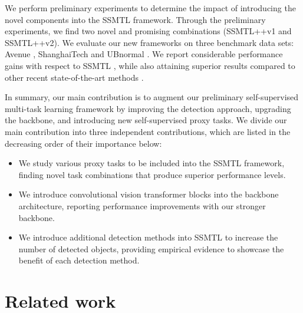 \documentclass[times,twocolumn,final,authoryear]{elsarticle}
\begin{document}
We perform preliminary experiments to determine the impact of introducing the novel components into the SSMTL framework. Through the preliminary experiments, we find two novel and promising combinations (SSMTL++v1 and SSMTL++v2). We evaluate our new frameworks on three benchmark data sets: Avenue \citep{Lu-ICCV-2013}, ShanghaiTech \citep{Luo-ICCV-2017} and UBnormal \citep{Acsintoae-CVPR-2022}. We report considerable performance gains with respect to SSMTL \citep{Georgescu-CVPR-2021}, while also attaining superior results compared to other recent state-of-the-art methods \citep{Astrid-BMVC-2021,Astrid-ICCVW-2021,Bertasius-ICML-2021,Chang-RP-2022,Dong-Access-2020,Doshi-CVPRW-2020a,Doshi-CVPRW-2020b,Georgescu-TPAMI-2021,Gong-ICCV-2019,Ionescu-CVPR-2019,Ionescu-WACV-2019,Ji-IJCNN-2020,Lee-TIP-2019,Li-CVIU-2021,Lin-AAAI-2022,Liu-ICCV-2021,Lu-ECCV-2020,Madan-ICCVW-2021,Nguyen-ICCV-2019,Park-WACV-2022,Park-CVPR-2020,Ramachandra-WACV-2020a,Ramachandra-WACV-2020b,Ristea-CVPR-2022,Sultani-CVPR-2018,Sun-ACMMM-2020,Vu-AAAI-2019,Wang-ACMMM-2020,Wu-TNNLS-2019,Yang-Access-2021,Yu-CVPR-2022,Yu-ACMMM-2020,Yu-TNNLS-2021,Zaheer-CVPR-2022}.

In summary, our main contribution is to augment our preliminary self-supervised multi-task learning framework \citep{Georgescu-CVPR-2021} by improving the detection approach, upgrading the backbone, and introducing new self-supervised proxy tasks. We divide our main contribution into three independent contributions, which are listed in the decreasing order of their importance below:
\begin{itemize}
    \item We study various proxy tasks to be included into the SSMTL framework, finding novel task combinations that produce superior performance levels.
    \item We introduce convolutional vision transformer blocks into the backbone architecture, reporting performance improvements with our stronger backbone.
    \item We introduce additional detection methods into SSMTL to increase the number of detected objects, providing empirical evidence to showcase the benefit of each detection method.
\end{itemize}

\section{Related work}
\end{document}
